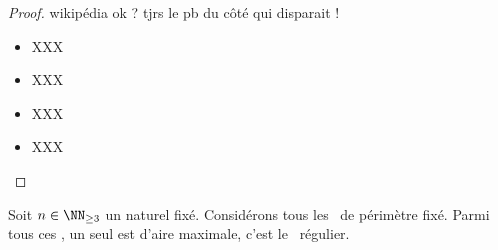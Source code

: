 \begin{proof}
	wikipédia ok ? tjrs le pb du côté qui disparait !
	\begin{itemize}
		\item XXX

		\item XXX

		\item XXX

		\item XXX
	\end{itemize}
\end{proof}




\begin{fact}
	Soit $n \in \NN_{\geq3}$ un naturel fixé.
	Considérons tous les \ngones\  de périmètre fixé. Parmi tous ces \ngones, un seul est d'aire maximale, c'est le \ngone\ régulier.
\end{fact}


